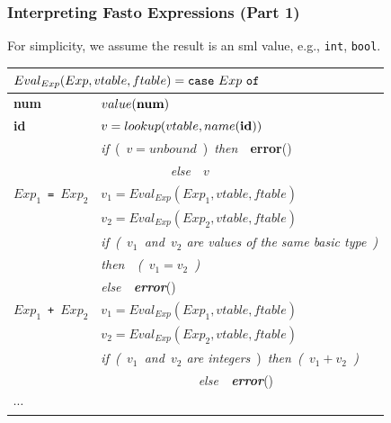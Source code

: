 \documentclass{beamer}
\begin{document}
\begin{frame}
\frametitle{Interpreting Fasto Expressions (Part 1)}

For simplicity, we assume the result is an {\sc sml} value, e.g., {\tt int}, {\tt bool}.
\bigskip
\renewcommand{\arraystretch}{0.9}
\begin{tabular}{|l|l|}\hline
\multicolumn{2}{|l|}{$ Eval_{Exp}(Exp,vtable,ftable) =
  \mbox{\tt case}~Exp~\mbox{\tt of}$} \\\hline

{\bf num} & $value(\mbox{\bf num})$ \\\hline

{\bf id}
        & $v = lookup(vtable,name(\mbox{\bf id}))$ \\
        & {\em if}~(~$v = unbound$~)~{\em then}~~{\bf error}()  \\
        & $~~~~~~~~~~~~~~~~~~~~~~~~~${\em else}~~$v$ \\\hline

$Exp_1$~{\tt =}~$Exp_2$
        & $v_1 = Eval_{Exp}(Exp_1,vtable,ftable)$ \\
        & $v_2 = Eval_{Exp}(Exp_2,vtable,ftable)$ \\
        & {\em if~(~$v_1$~and~$v_2$ are values of the same basic type~)} \\
        & {\em then~~(~$v_1 = v_2$~)} \\
        & {\em else~~\mbox{\bf error}}() \\\hline

$Exp_1$~{\tt +}~$Exp_2$
        & $v_1 = Eval_{Exp}(Exp_1,vtable,ftable)$ \\
        & $v_2 = Eval_{Exp}(Exp_2,vtable,ftable)$ \\
        & {\em if~(~$v_1$~and~$v_2$ are integers}~)~{\em then~(~$v_1+v_2$~)} \\
        &$~~~~~~~~~~~~~~~~~~~~~~~~~~~~~~~~~~~${\em else~~\mbox{\bf error}}() \\\hline

$\cdots$ & \\\hline

\end{tabular}
\end{frame}
\end{document}
